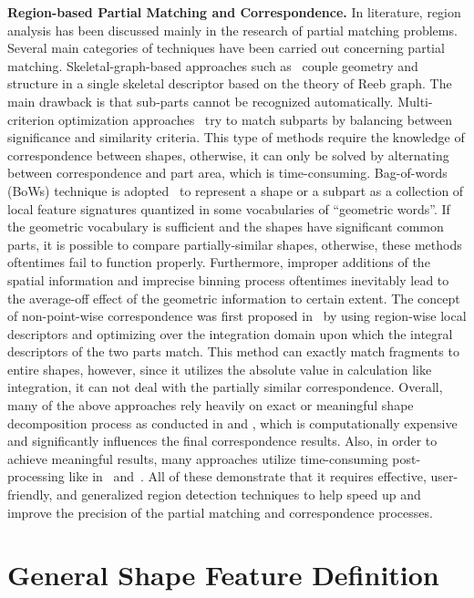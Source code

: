 \textbf{Region-based Partial Matching and Correspondence.} In
literature, region analysis has been discussed mainly in the research
of partial matching problems. Several main categories of techniques
have been carried out concerning partial matching.
Skeletal-graph-based approaches such as~\cite{Biasotti:2006} couple
geometry and structure in a single skeletal descriptor based on the
theory of Reeb graph. The main drawback is that sub-parts cannot be
recognized automatically. Multi-criterion optimization
approaches~\cite{Bronstein:2008,Castellani:2008,Lavoue:2011} try to
match subparts by balancing between significance and similarity
criteria. This type of methods require the knowledge of correspondence
between shapes, otherwise, it can only be solved by alternating
between correspondence and part area, which is time-consuming.
Bag-of-words (BoWs) technique is
adopted~\cite{Zaharescu2009,Kokkinos:2012} to represent a shape or
a subpart as a collection of local feature signatures quantized in
some vocabularies of ``geometric words''. If the geometric vocabulary
is sufficient and the shapes have significant common parts, it is
possible to compare partially-similar shapes, otherwise, these methods
oftentimes fail to function properly.  Furthermore,
improper additions of the spatial information and imprecise binning
process oftentimes inevitably lead to the average-off effect of the
geometric information to certain extent. The concept of
non-point-wise correspondence was first proposed
in~\cite{Bronstein:2013} by using region-wise local descriptors and
optimizing over the integration domain upon which the integral
descriptors of the two parts match. This method can exactly match
fragments to entire shapes, however, since it utilizes the absolute
value in calculation like integration, it can not
deal with the partially similar correspondence.
Overall, many of the above approaches rely heavily on
exact or meaningful shape decomposition process as conducted
in \cite{Itskovich2011} and \cite{Lavoue:2012}, which is computationally
expensive and significantly influences the final correspondence
results. Also, in order to achieve meaningful results, many
approaches utilize time-consuming post-processing like
in~\cite{Gal2006} and~\cite{Itskovich2011}. All of these
demonstrate that it requires effective, user-friendly, and generalized
region detection techniques to help speed up and improve the precision
of the partial matching and correspondence processes.

\section{General Shape Feature Definition}
\label{sec:GF}

